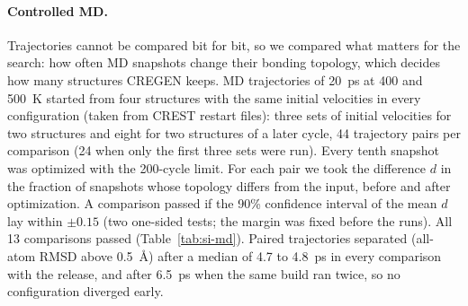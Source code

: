 \documentclass[journal=jctcce,manuscript=suppinfo]{achemso}
\begin{document}
\paragraph{Controlled MD.} Trajectories cannot be compared bit for bit, so we compared what matters for the search: how
often MD snapshots change their bonding topology, which decides how many structures CREGEN keeps. MD trajectories of
20~ps at 400 and 500~K started from four structures with the same initial velocities in every configuration (taken from
CREST restart files): three sets of initial velocities for two structures and eight for two structures of a later cycle, 44 trajectory pairs per comparison (24 when only the first three sets were run). Every tenth snapshot was optimized with the 200-cycle limit. For each pair
we took the difference $d$ in the fraction of snapshots whose topology differs from the input, before and after
optimization. A comparison passed if the 90\% confidence interval of the mean $d$ lay within $\pm0.15$ (two one-sided
tests; the margin was fixed before the runs). All 13 comparisons passed (Table~\ref{tab:si-md}). Paired trajectories
separated (all-atom RMSD above 0.5~\AA) after a median of 4.7 to 4.8~ps in every comparison with the release, and after
6.5~ps when the same build ran twice, so no configuration diverged early.
\end{document}
